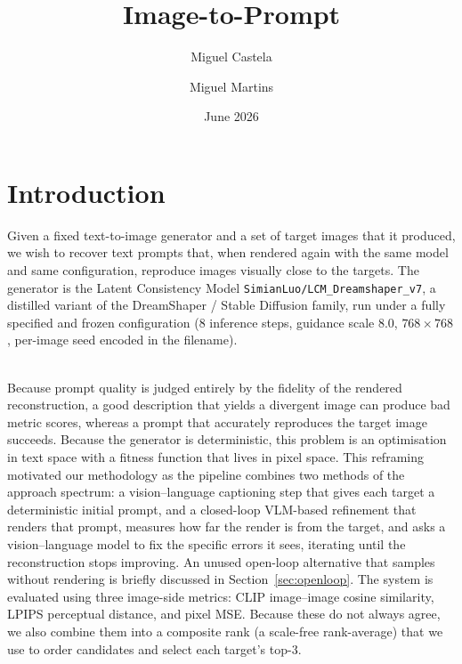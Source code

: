 \documentclass[runningheads]{llncs}
\begin{document}
\title{Image-to-Prompt}
\author{Miguel Castela \and
Miguel Martins}
%
%
\date{June 2026}


\maketitle

\section{Introduction}
Given a fixed text-to-image generator and a set of target images that it produced, we wish to recover text prompts that, when rendered again with the same model and same configuration, reproduce images visually close to the targets. The generator is the Latent Consistency Model \texttt{SimianLuo/LCM\_Dreamshaper\_v7}, a distilled variant of the DreamShaper / Stable Diffusion family, run under a fully specified and frozen configuration (8 inference steps, guidance scale 8.0, $768\times768$, per-image seed encoded in the filename).

\noindent
\\
Because prompt quality is judged entirely by the fidelity of the rendered reconstruction, a good description that yields a divergent image can produce bad metric scores, whereas a prompt that accurately reproduces the target image succeeds. Because the generator is deterministic, this problem is an optimisation in text space with a fitness function that lives in pixel space. This reframing motivated our methodology as the pipeline combines two methods of the approach spectrum: a vision–language captioning step that gives each target a deterministic initial prompt, and a closed-loop VLM-based refinement that renders that prompt, measures how far the render is from the target, and asks a vision–language model to fix the specific errors it sees, iterating until the reconstruction stops improving. An unused open-loop alternative that samples without rendering is briefly discussed in Section~\ref{sec:openloop}. The system is evaluated using three image-side metrics: CLIP image–image cosine similarity, LPIPS perceptual distance, and pixel MSE. Because these do not always agree, we also combine them into a composite rank (a scale-free rank-average) that we use to order candidates and select each target's top-3.
\end{document}
